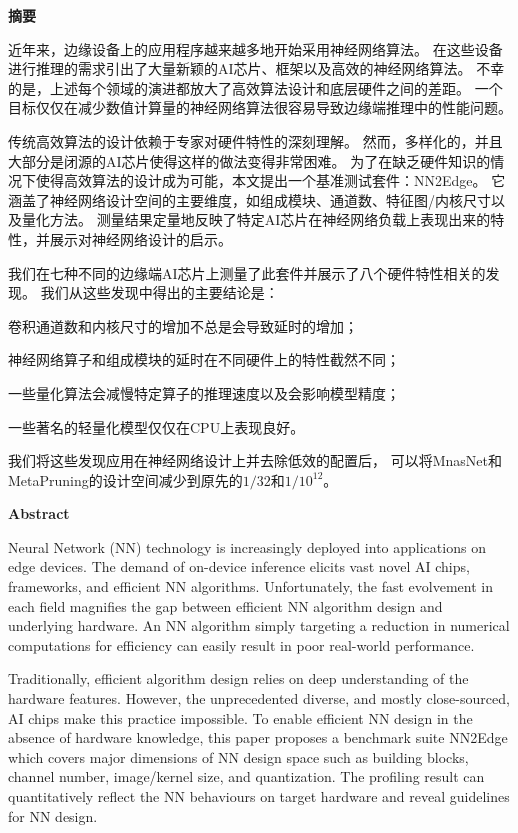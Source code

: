\cleardoublepage{}
\begin{center}
    \bfseries {} 摘要
\end{center}
近年来，边缘设备上的应用程序越来越多地开始采用神经网络算法。
在这些设备进行推理的需求引出了大量新颖的AI芯片、框架以及高效的神经网络算法。
不幸的是，上述每个领域的演进都放大了高效算法设计和底层硬件之间的差距。
一个目标仅仅在减少数值计算量的神经网络算法很容易导致边缘端推理中的性能问题。

传统高效算法的设计依赖于专家对硬件特性的深刻理解。
然而，多样化的，并且大部分是闭源的AI芯片使得这样的做法变得非常困难。
为了在缺乏硬件知识的情况下使得高效算法的设计成为可能，本文提出一个基准测试套件：NN2Edge。
它涵盖了神经网络设计空间的主要维度，如组成模块、通道数、特征图/内核尺寸以及量化方法。
测量结果定量地反映了特定AI芯片在神经网络负载上表现出来的特性，并展示对神经网络设计的启示。

我们在七种不同的边缘端AI芯片上测量了此套件并展示了八个硬件特性相关的发现。
我们从这些发现中得出的主要结论是：
\begin{enumerate*}
    \item 卷积通道数和内核尺寸的增加不总是会导致延时的增加；
    \item 神经网络算子和组成模块的延时在不同硬件上的特性截然不同；
    \item 一些量化算法会减慢特定算子的推理速度以及会影响模型精度；
    \item 一些著名的轻量化模型仅仅在CPU上表现良好。
\end{enumerate*}

我们将这些发现应用在神经网络设计上并去除低效的配置后，
可以将MnasNet和MetaPruning的设计空间减少到原先的$1/32$和$1/10^{12}$。

\cleardoublepage{}
\begin{center}
    \bfseries {} Abstract
\end{center}
Neural Network (NN) technology is increasingly deployed
into applications on edge devices. The demand of on-device
inference elicits vast novel AI chips, frameworks, and efficient NN algorithms.
Unfortunately, the fast evolvement in
each field magnifies the gap between efficient NN algorithm
design and underlying hardware. An NN algorithm simply
targeting a reduction in numerical computations for efficiency
can easily result in poor real-world performance.

Traditionally, efficient algorithm design relies on deep understanding of the hardware features. 
However, the unprecedented diverse, and mostly close-sourced, AI chips make
this practice impossible. To enable efficient NN design in
the absence of hardware knowledge, this paper proposes a
benchmark suite NN2Edge which covers major dimensions
of NN design space such as building blocks, channel number,
image/kernel size, and quantization. The profiling result can
quantitatively reflect the NN behaviours on target
hardware and reveal guidelines for NN design.

